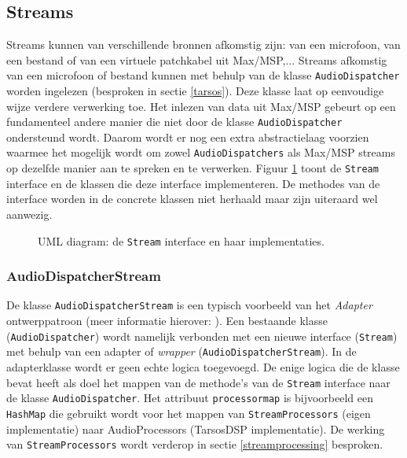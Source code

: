 \subsection{Streams}
\label{streams-design}

Streams kunnen van verschillende bronnen afkomstig zijn: van een microfoon, van een bestand of van een virtuele patchkabel uit Max/MSP,... Streams afkomstig van een microfoon of bestand kunnen met behulp van de klasse \texttt{AudioDispatcher} worden ingelezen (besproken in sectie \ref{tarsos}). Deze klasse laat op eenvoudige wijze verdere verwerking toe. Het inlezen van data uit Max/MSP gebeurt op een fundamenteel andere manier die niet door de klasse \texttt{AudioDispatcher} ondersteund wordt. Daarom wordt er nog een extra abstractielaag voorzien waarmee het mogelijk wordt om zowel \texttt{AudioDispatchers} als Max/MSP streams op dezelfde manier aan te spreken en te verwerken. Figuur \ref{StreamUml} toont de \texttt{Stream} interface en de klassen die deze interface implementeren. De methodes van de interface worden in de concrete klassen niet herhaald maar zijn uiteraard wel aanwezig.

\begin{figure}[h!]
	\captionsetup{width=0.7\textwidth}
	\caption[UML diagram van streams]{UML diagram: de \texttt{Stream} interface en haar implementaties.}
	\begin{center}
		\advance\parskip0.3cm
		
	\end{center}
	\label{StreamUml}
\end{figure}

\subsubsection{AudioDispatcherStream}
De klasse \texttt{AudioDispatcherStream} is een typisch voorbeeld van het \textit{Adapter} ontwerppatroon (meer informatie hierover: \cite{vlissides1995design}). Een bestaande klasse (\texttt{AudioDispatcher}) wordt namelijk verbonden met een nieuwe interface (\texttt{Stream}) met behulp van een adapter of \textit{wrapper} (\texttt{AudioDispatcherStream}). In de adapterklasse wordt er geen echte logica toegevoegd. De enige logica die de klasse bevat heeft als doel het mappen van de methode's van de \texttt{Stream} interface naar de klasse \texttt{AudioDispatcher}. Het attribuut \texttt{processormap} is bijvoorbeeld een \texttt{HashMap} die gebruikt wordt voor het mappen van \texttt{StreamProcessors} (eigen implementatie) naar AudioProcessors (TarsosDSP implementatie). De werking van \texttt{StreamProcessors} wordt verderop in sectie \ref{streamprocessing} besproken.

